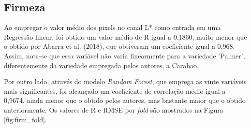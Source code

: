 


\subsection{Firmeza}

Ao empregar o valor médio dos pixels no canal L* como entrada em uma Regressão linear, foi obtido um valor médio de R igual a 0,1860, muito menor que o obtido por Abarra et al. (2018), que obtiveram um coeficiente igual a 0,968. Assim, nota-se que essa variável não varia linearmente para a variedade 'Palmer', diferentemente da variedade empregada pelos autores, a Carabao.

Por outro lado, através do modelo \textit{Random Forest}, que emprega as vinte variáveis mais significantes, foi alcançado um coeficiente de correlação médio igual a 0,9674, ainda menor que o obtido pelos autores, mas bastante maior que o obtido anteriormente. Os valores de R e RMSE por \textit{fold} são mostrados na Figura \ref{fig:firm_fold}.

